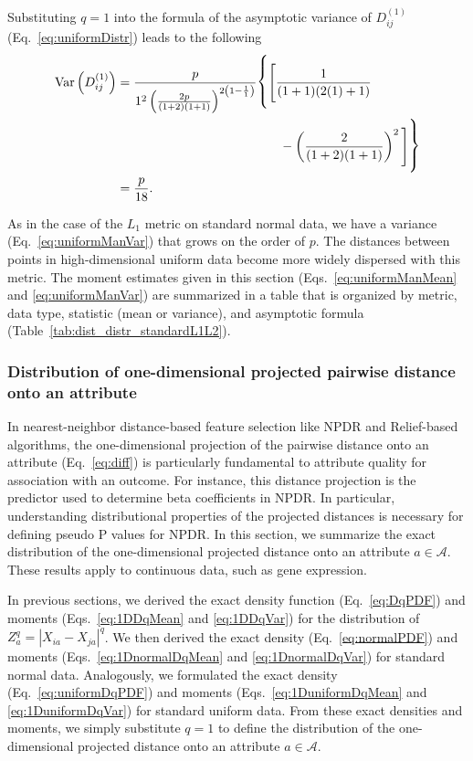 \documentclass[aos]{imsart}
\begin{document}
Substituting $q=1$ into the formula of the asymptotic variance of $D^{(1)}_{ij}$ (Eq.~\ref{eq:uniformDistr}) leads to the following
%
\begin{equation}\label{eq:uniformManVar}
\begin{aligned}
\text{Var}\left(D^{(1)}_{ij}\right) &= \frac{p}{1^2\left(\frac{2p}{(1 + 2)(1 + 1)}\right)^{2\left(1 - \frac{1}{1}\right)}} {\fontsize{0.5cm}{1pt}\selectfont \Biggr\{}{\Biggl[}\frac{1}{(1 + 1)(2(1) + 1)}\\
&\hspace{4.5cm}- \left(\frac{2}{(1 + 2)(1 + 1)}\right)^2{\Biggr]}{\fontsize{0.5cm}{1pt}\selectfont \Biggr\}} \\
&= \frac{p}{18}.
\end{aligned}
\end{equation}

As in the case of the $L_1$ metric on standard normal data, we have a variance (Eq.~\ref{eq:uniformManVar}) that grows on the order of $p$. The distances between points in high-dimensional uniform data become more widely dispersed with this metric. The moment estimates given in this section (Eqs.~\ref{eq:uniformManMean} and \ref{eq:uniformManVar}) are summarized in a table that is organized by metric, data type, statistic (mean or variance), and asymptotic formula (Table~\ref{tab:dist_distr_standardL1L2}).

\subsubsection{Distribution of one-dimensional projected pairwise distance onto an attribute}\label{sec:continuous_diff}

In nearest-neighbor distance-based feature selection like NPDR and Relief-based algorithms, the one-dimensional projection of the pairwise distance onto an attribute (Eq.~\ref{eq:diff}) is particularly fundamental to attribute quality for association with an outcome. For instance, this distance projection is the predictor used to determine beta coefficients in NPDR. In particular, understanding distributional properties of the projected distances is necessary for defining pseudo P values for NPDR. In this section, we summarize the exact distribution of the one-dimensional projected distance onto an attribute $a \in \mathcal{A}$. These results apply to continuous data, such as gene expression. 

In previous sections, we derived the exact density function (Eq.~\ref{eq:DqPDF}) and moments (Eqs.~\ref{eq:1DDqMean} and \ref{eq:1DDqVar}) for the distribution of $Z^q_a=|X_{ia}-X_{ja}|^q$. We then derived the exact density (Eq.~\ref{eq:normalPDF}) and moments (Eqs.~\ref{eq:1DnormalDqMean} and \ref{eq:1DnormalDqVar}) for standard normal data. Analogously, we formulated the exact density (Eq.~\ref{eq:uniformDqPDF}) and moments (Eqs.~\ref{eq:1DuniformDqMean} and \ref{eq:1DuniformDqVar}) for standard uniform data. From these exact densities and moments, we simply substitute $q=1$ to define the distribution of the one-dimensional projected distance onto an attribute $a \in \mathcal{A}$.
\end{document}
